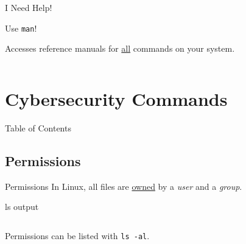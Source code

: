 \documentclass{beamer}
\begin{document}
\begin{frame}{I Need Help!}
	\pause
	\begin{center}
		\begin{Large}
			Use \texttt{man}! \\
		\end{Large}
		\pause
		Accesses reference manuals for \underline{all} commands on your system.
	\end{center}
	\pause
	\tiny\inputminted{shell-session}{man.txt}
\end{frame}

%
%
%
%
%
%
%

\section{Cybersecurity Commands}
\begin{frame}{Table of Contents}
	\tableofcontents[currentsection]
\end{frame}

\subsection{Permissions}
\begin{frame}{Permissions}
	In Linux, all files are \underline{owned} by a \textit{user} and a
	\textit{group}.
	\pause

	\begin{exampleblock}{ls output}
		\inputminted{shell-session}{lsal.txt}
	\end{exampleblock}
	\pause

	Permissions can be listed with \texttt{ls -al}.
\end{frame}
\end{document}

